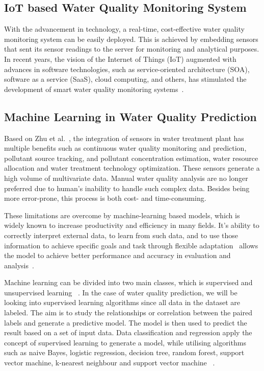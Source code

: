 \documentclass[conference]{IEEEtran}
\begin{document}
\subsection{IoT based Water Quality Monitoring System}
With the advancement in technology, a real-time, cost-effective water quality monitoring system can be easily deployed. This is achieved by embedding sensors that sent its sensor readings to the server for monitoring and analytical purposes. In recent years, the vision of the Internet of Things (IoT) augmented with advances in software technologies, such as service-oriented architecture (SOA), software as a service (SaaS), cloud computing, and others, has stimulated the development of smart water quality monitoring systems~\cite{martinezetal}. 

\subsection{Machine Learning in Water Quality Prediction}
Based on Zhu et al.~\cite{zhu2022review}, the integration of sensors in water treatment plant has multiple benefits such as continuous water quality monitoring and prediction, pollutant source tracking, and pollutant concentration estimation, water resource allocation and water treatment technology optimization. These sensors generate a high volume of multivariate data. Manual water quality analysis are no longer preferred due to human's inability to handle such complex data. Besides being more error-prone, this process is both cost- and time-consuming.

These limitations are overcome by machine-learning based models, which is widely known to increase productivity and efficiency in many fields. It's ability to correctly interpret external data, to learn from such data, and to use those information to achieve specific goals and task through flexible adaptation~\cite{haenlein2019brief} allows the model to achieve better performance and accuracy in evaluation and analysis~\cite{geetha2020overview}. 

Machine learning can be divided into two main classes, which is supervised and unsupervised learning ~\cite{berry2019supervised}. In the case of water quality prediction, we will be looking into supervised learning algorithms since all data in the dataset are labeled. The aim is to study the relationships or correlation between the paired labels and generate a predictive model. The model is then used to predict the result based on a set of input data. Data classification and regression apply the concept of supervised learning to generate a model, while utilising algorithms such as naive Bayes, logistic regression, decision tree, random forest, support vector machine, k-nearest neighbour and support vector machine ~\cite{zhu2022review}. 
\end{document}

